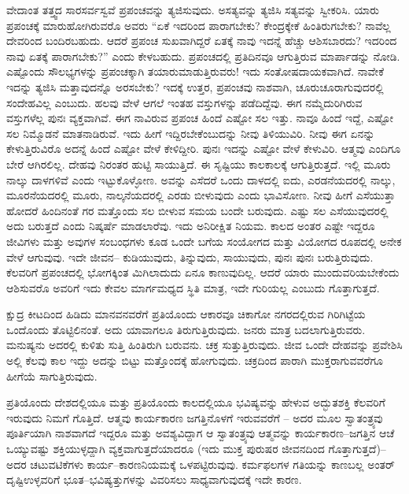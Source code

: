 ವೇದಾಂತ ತತ್ತ್ವದ ಸಾರಸರ್ವಸ್ವವೆ ಪ್ರಪಂಚವನ್ನು ತ್ಯಜಿಸುವುದು. ಅಸತ್ಯವನ್ನು ತ್ಯಜಿಸಿ ಸತ್ಯವನ್ನು ಸ್ವೀಕರಿಸಿ. ಯಾರು ಪ್ರಪಂಚಕ್ಕೆ ಮಾರುಹೋಗಿರುವರೊ ಅವರು “ಏಕೆ ಇದರಿಂದ ಪಾರಾಗಬೇಕು? ಕೇಂದ್ರಕ್ಕೇಕೆ ಹಿಂತಿರುಗಬೇಕು? ನಾವೆಲ್ಲ ದೇವರಿಂದ ಬಂದಿರಬಹುದು. ಆದರೆ ಪ್ರಪಂಚ ಸುಖವಾಗಿದ್ದರೆ ಏತಕ್ಕೆ ನಾವು ಇದನ್ನೆ ಹೆಚ್ಚು ಆಶಿಸಬಾರದು? ಇದರಿಂದ ನಾವು ಏತಕ್ಕೆ ಪಾರಾಗಬೇಕು?” ಎಂದು ಕೇಳಬಹುದು. ಪ್ರಪಂಚದಲ್ಲಿ ಪ್ರತಿದಿನವೂ ಆಗುತ್ತಿರುವ ಮಾರ್ಪಾಡನ್ನು ನೋಡಿ. ಎಷ್ಟೊಂದು ಸೌಲಭ್ಯಗಳನ್ನು ಪ್ರಪಂಚಕ್ಕಾಗಿ ತಯಾರುಮಾಡುತ್ತಿರುವರು! ಇದು ಸಂತೋಷದಾಯಕವಾಗಿದೆ. ನಾವೇಕೆ ಇದನ್ನು ತ್ಯಜಿಸಿ ಮತ್ತಾವುದನ್ನೊ ಅರಸಬೇಕು? ಇದಕ್ಕೆ ಉತ್ತರ, ಪ್ರಪಂಚವು ನಾಶವಾಗಿ, ಚೂರುಚೂರಾಗುವುದರಲ್ಲಿ ಸಂದೇಹವಿಲ್ಲ ಎಂಬುದು. ಹಲವು ವೇಳೆ ಆಗಲೆ ಇಂತಹ ವಸ್ತುಗಳನ್ನು ಪಡೆದಿದ್ದೆವು. ಈಗ ನಮ್ಮೆದುರಿಗಿರುವ ವಸ್ತುಗಳೆಲ್ಲ ಪುನಃ ವ್ಯಕ್ತವಾಗಿವೆ. ಈಗ ನಾವಿರುವ ಪ್ರಪಂಚ ಹಿಂದೆ ಎಷ್ಟೋ ಸಲ ಇತ್ತು. ನಾವೂ ಹಿಂದೆ ಇದ್ದೆ, ಎಷ್ಟೋ ಸಲ ನಿಮ್ಮೊಡನೆ ಮಾತನಾಡಿರುವೆ. ಇದು ಹೀಗೆ ಇದ್ದಿರಬೇಕೆಂಬುದನ್ನು ನೀವು ತಿಳಿಯುವಿರಿ. ನೀವು ಈಗ ಏನನ್ನು ಕೇಳುತ್ತಿರುವಿರೊ ಅದನ್ನೆ ಹಿಂದೆ ಎಷ್ಟೋ ವೇಳೆ ಕೇಳಿದ್ದೀರಿ. ಪುನಃ ಇದನ್ನು ಎಷ್ಟೋ ವೇಳೆ ಕೇಳುವಿರಿ. ಆತ್ಮವು ಎಂದಿಗೂ ಬೇರೆ ಆಗಿರಲಿಲ್ಲ. ದೇಹವು ನಿರಂತರ ಹುಟ್ಟಿ ಸಾಯುತ್ತಿದೆ. ಈ ಸೃಷ್ಟಿಯು ಕಾಲಕಾಲಕ್ಕೆ ಆಗುತ್ತಿರುತ್ತದೆ. ಇಲ್ಲಿ ಮೂರು ನಾಲ್ಕು ದಾಳಗಳಿವೆ ಎಂದು ಇಟ್ಟುಕೊಳ್ಳೋಣ. ಅವನ್ನು ಎಸೆದರೆ ಒಂದು ದಾಳದಲ್ಲಿ ಐದು, ಎರಡನೆಯದರಲ್ಲಿ ನಾಲ್ಕು, ಮೂರನೆಯದರಲ್ಲಿ ಮೂರು, ನಾಲ್ಕನೆಯದರಲ್ಲಿ ಎರಡು ಬೀಳುವುದು ಎಂದು ಭಾವಿಸೋಣ. ನೀವು ಹೀಗೆ ಎಸೆಯುತ್ತಾ ಹೋದರೆ ಹಿಂದಿನಂತೆ ಗರ ಮತ್ತೊಂದು ಸಲ ಬೀಳುವ ಸಮಯ ಬಂದೇ ಬರುವುದು. ಎಷ್ಟು ಸಲ ಎಸೆಯುವುದರಲ್ಲಿ ಅದು ಬರುತ್ತದೆ ಎಂದು ನಿಷ್ಕರ್ಷೆ ಮಾಡಲಾರೆವು. ಇದು ಅನಿರೀಕ್ಷಿತ ನಿಯಮ. ಕಾಲದ ಅಂತರ ಎಷ್ಟೇ ಇದ್ದರೂ ಜೀವಿಗಳು ಮತ್ತು ಅವುಗಳ ಸಂಬಂಧಗಳು ಕೂಡ ಒಂದೇ ಬಗೆಯ ಸಂಯೋಗದ ಮತ್ತು ವಿಯೋಗದ ರೂಪದಲ್ಲಿ ಅನೇಕ ವೇಳೆ ಆಗುವುವು. ಇದೇ ಜೀವನ– ಕುಡಿಯುವುದು, ತಿನ್ನುವುದು, ಸಾಯುವುದು, ಪುನಃ ಪುನಃ ಬರುತ್ತಿರುವುದು. ಕೆಲವರಿಗೆ ಪ್ರಪಂಚದಲ್ಲಿ ಭೋಗಕ್ಕಿಂತ ಮಿಗಿಲಾದುದು ಏನೂ ಕಾಣುವುದಿಲ್ಲ. ಆದರೆ ಯಾರು ಮುಂದುವರಿಯಬೇಕೆಂದು ಆಶಿಸುವರೊ ಅವರಿಗೆ ಇದು ಕೇವಲ ಮಾರ್ಗಮಧ್ಯದ ಸ್ಥಿತಿ ಮಾತ್ರ, ಇದೇ ಗುರಿಯಲ್ಲ ಎಂಬುದು ಗೊತ್ತಾಗುತ್ತದೆ.

ಕ್ಷುದ್ರ ಕೀಟದಿಂದ ಹಿಡಿದು ಮಾನವನವರೆಗೆ ಪ್ರತಿಯೊಂದು ಆಕಾರವೂ ಚಿಕಾಗೋ ನಗರದಲ್ಲಿರುವ ಗಿರಿಗಿಟ್ಟೆಯ ಒಂದೊಂದು ತೊಟ್ಟಿಲಿನಂತೆ. ಅದು ಯಾವಾಗಲೂ ತಿರುಗುತ್ತಿರುವುದು. ಜನರು ಮಾತ್ರ ಬದಲಾಗುತ್ತಿರುವರು. ಮನುಷ್ಯನು ಅದರಲ್ಲಿ ಕುಳಿತು ಸುತ್ತಿ ಹಿಂತಿರುಗಿ ಬರುವನು. ಚಕ್ರ ಸುತ್ತುತ್ತಿರುವುದು. ಜೀವ ಒಂದೇ ದೇಹವನ್ನು ಪ್ರವೇಶಿಸಿ ಅಲ್ಲಿ ಕೆಲವು ಕಾಲ ಇದ್ದು ಅದನ್ನು ಬಿಟ್ಟು ಮತ್ತೊಂದಕ್ಕೆ ಹೋಗುವುದು. ಚಕ್ರದಿಂದ ಪಾರಾಗಿ ಮುಕ್ತರಾಗುವವರೆಗೂ ಹೀಗೆಯೆ ಸಾಗುತ್ತಿರುವುದು.

ಪ್ರತಿಯೊಂದು ದೇಶದಲ್ಲಿಯೂ ಮತ್ತು ಪ್ರತಿಯೊಂದು ಕಾಲದಲ್ಲಿಯೂ ಭವಿಷ್ಯವನ್ನು ಹೇಳುವ ಅದ್ಭುತಶಕ್ತಿ ಕೆಲವರಿಗೆ ಇರುವುದು ನಿಮಗೆ ಗೊತ್ತಿದೆ. ಆತ್ಮವು ಕಾರ್ಯಕಾರಣ ಜಗತ್ತಿನೊಳಗೆ ಇರುವವರೆಗೆ – ಅದರ ಮೂಲ ಸ್ವಾತಂತ್ರ್ಯವು ಪೂರ್ತಿಯಾಗಿ ನಾಶವಾಗದೆ ಇದ್ದರೂ ಮತ್ತು ಅವಶ್ಯವಿದ್ದಾಗ ಆ ಸ್ವಾತಂತ್ರ್ಯವು ಆತ್ಮವನ್ನು ಕಾರ್ಯಕಾರಣ–ಜಗತ್ತಿನ ಆಚೆ ಒಯ್ಯುವಷ್ಟು ಶಕ್ತಿಯುಳ್ಳದ್ದಾಗಿ ವ್ಯಕ್ತವಾಗುತ್ತದೆಯಾದರೂ (ಇದು ಮುಕ್ತ ಪುರುಷರ ಜೀವನದಿಂದ ಗೊತ್ತಾಗುತ್ತದೆ)– ಅದರ ಚಟುವಟಿಕೆಗಳು ಕಾರ್ಯ–ಕಾರಣನಿಯಮಕ್ಕೆ ಒಳಪಟ್ಟಿರುವುವು. ಕರ್ಮಫಲಗಳ ಗತಿಯನ್ನು ಕಾಣಬಲ್ಲ ಅಂತರ್​ದೃಷ್ಟಿಉಳ್ಳವರಿಗೆ ಭೂತ–ಭವಿಷ್ಯತ್ತುಗಳನ್ನು ವಿವರಿಸಲು ಸಾಧ್ಯವಾಗುವುದಕ್ಕೆ ಇದೇ ಕಾರಣ.

